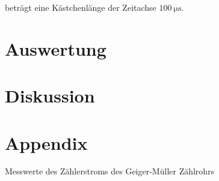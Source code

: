     \justifying beträgt eine Kästchenlänge der Zeitachse $\SI{100}{\micro\second}$. 




\section{Auswertung}

\section{Diskussion}

\newpage
\printbibliography

\section{Appendix}

    

    \begin{table}[H]
        \centering
        
        \caption{Messwerte des Zählerstroms des Geiger-Müller Zählrohrs}
        \label{tab:1}
    \end{table}

